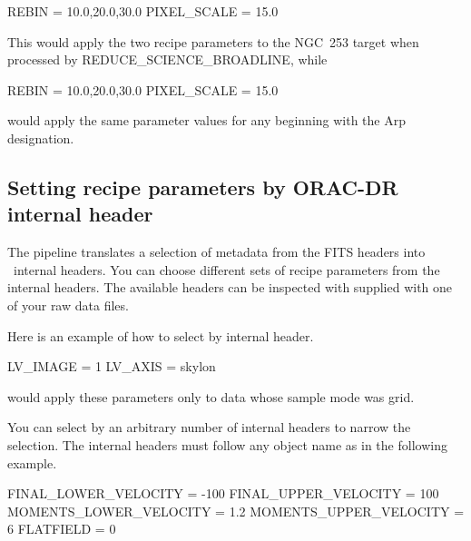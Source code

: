 \documentclass[11pt,oneside,chapters]{starlink}
\begin{document}
\vspace{0.2cm}
\begin{terminalv}
REBIN = 10.0,20.0,30.0
PIXEL_SCALE = 15.0
\end{terminalv}

This would apply the two recipe parameters to the NGC~253 target
when processed by REDUCE\_SCIENCE\_BROADLINE, while

\vspace{0.2cm}
\begin{terminalv}
REBIN = 10.0,20.0,30.0
PIXEL_SCALE = 15.0
\end{terminalv}

would apply the same parameter values for any beginning with the Arp
designation.

\subsection{Setting recipe parameters by ORAC-DR internal header}
\label{sec:recpars_orac}

The pipeline translates a selection of metadata from the FITS headers
into \oracdr\ internal headers.  You can choose different sets of recipe
parameters from the internal headers.  The available headers can be
inspected with  supplied with one of your raw data
files.

\vspace{0.2cm}
\begin{terminalv}
\end{terminalv}

Here is an example of how to select by internal header.

\vspace{0.2cm}
\begin{terminalv}
[REDUCE_SCIENCE_NARROWLINE#SAMPLE_MODE=GRID]
LV_IMAGE = 1
LV_AXIS = skylon
\end{terminalv}

would apply these parameters only to data whose sample mode was grid.

You can select by an arbitrary number of internal headers to
narrow the selection.  The internal headers must follow any object name
as in the following example.

\vspace{0.2cm}
\begin{terminalv}
[REDUCE_SCIENCE_NARROWLINE:HH21#SPECIES=C-18-O#BANDWIDTH_MODE=250MHzx4096]
FINAL_LOWER_VELOCITY = -100
FINAL_UPPER_VELOCITY = 100
MOMENTS_LOWER_VELOCITY = 1.2
MOMENTS_UPPER_VELOCITY = 6
FLATFIELD = 0
\end{terminalv}
\end{document}
